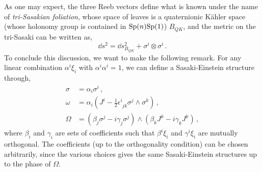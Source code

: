 \documentclass[debug]{phd}
\begin{document}
					As one may expect, the three Reeb vectors define what is known under the name of \emph{tri-Sasakian foliation}, whose space of leaves is a quaternionic K\"ahler space (whose holonomy group is contained in $\mathrm{Sp}(n)\mathrm{Sp}(1)$) $B_{QK}$, and the metric on the tri-Sasaki can be written as,
							\begin{equation}
								\dd s^2 = \dd s^2_{B_{QK}} + \sigma^i \otimes \sigma ^i \, .
							\end{equation}
					To conclude this discussion, we want to make the following remark.
					For any linear combination $\alpha^i \xi_i$ with $\alpha^i \alpha^i =1$, we can define a Sasaki-Einstein structure through,
							\begin{align*}
								\sigma &= \alpha_i \sigma^i \, , \\
								\omega &= \alpha_i \left(J^i - \frac{1}{2} \epsilon^i_{\phantom{i}jk} \sigma^j \wedge \sigma^k \right) \, , \\
								\Omega &= \left(\beta_j \sigma^j - i \gamma_j \sigma^j \right) \wedge \left(\beta_k J^k - i \gamma_k J^k \right)\, ,
							\end{align*}
					where $\beta_i$ and $\gamma_i$ are sets of coefficients such that $\beta^i \xi_i$ and $\gamma^i \xi_i$ are mutually orthogonal.
					The coefficients (up to the orthogonality condition) can be chosen arbitrarily, since the various choices gives the same Sasaki-Einstein structures up to the phase of $\Omega$.
\end{document}
